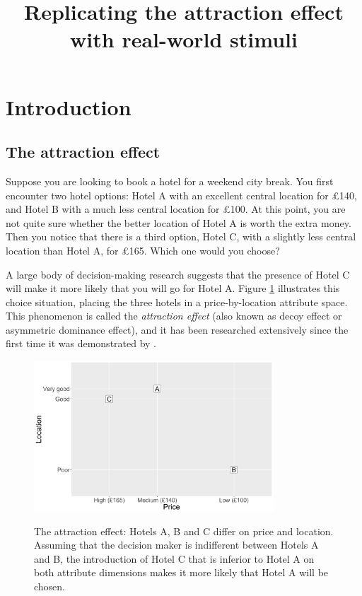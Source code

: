 \documentclass[11pt,a4paper]{article}
\title{\huge{Replicating the attraction effect with real-world stimuli}}
\date{}
\begin{document}
\maketitle

\section{Introduction} 

\subsection{The attraction effect} \label{AE intro}

Suppose you are looking to book a hotel for a weekend city break. You first encounter two hotel options: Hotel A with an excellent central location for £140, and Hotel B with a much less central location for £100. At this point, you are not quite sure whether the better location of Hotel A is worth the extra money. Then you notice that there is a third option, Hotel C, with a slightly less central location than Hotel A, for £165. Which one would you choose?


A large body of decision-making research suggests that the presence of Hotel C will make it more likely that you will go for Hotel A. Figure \ref{fig:exp1_intro} illustrates this choice situation, placing the three hotels in a price-by-location attribute space. This phenomenon is called the \textit{attraction effect} (also known as decoy effect or asymmetric dominance effect), and it has been researched extensively since the first time it was demonstrated by .

\begin{figure}[htb]
\centering
\captionsetup{justification=centering}
\caption{The attraction effect: Hotels A, B and C differ on price and location. Assuming that the decision maker is indifferent between Hotels A and B, the introduction of Hotel C that is inferior to Hotel A on both attribute dimensions makes it more likely that Hotel A will be chosen.}
\includegraphics[width=0.8\textwidth]{exp1_intro.png}
\label{fig:exp1_intro}
\end{figure}
\end{document}
